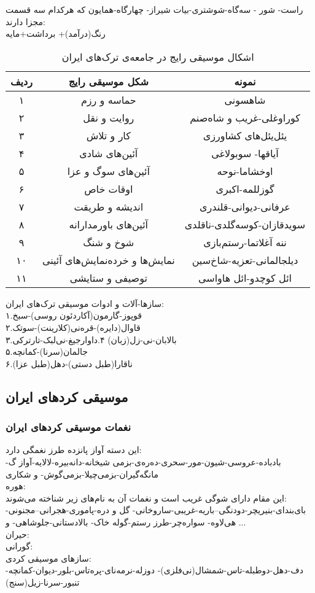        راست- شور - سه‌گاه-شوشتری-بیات شیراز- چهارگاه-همایون
        که هرکدام سه قسمت مجزا دارند:\\
        
        رنگ(درآمد)+ برداشت+مایه
        
        \begin{table}[!h]
\centering
\begin{tabular}{|c|c|c|}
	\hline
    ردیف &  شکل موسیقی رایج &  نمونه\\
	\hline\hline
    ۱ & حماسه و رزم & شاهسونی \\
	\hline
    ۲ & روایت و نقل& کوراوغلی-غریب و شاه‌صنم \\
	\hline
	۳ & کار و تلاش & یئل‌یئل‌های کشاورزی
\\	\hline
	۴ &آئین‌های شادی  & آیاقها- سوبولاغی \\
	\hline
	۵ & آئین‌های سوگ و عزا & اوخشاما-نوحه \\
	\hline
	۶ & اوقات خاص & گوزللمه-اکبری \\
	\hline
	۷ & اندیشه و طریقت & عرفانی-دیوانی-قلندری  \\
	\hline
	۸ & آئین‌های باورمدارانه & سویدقازان-کوسه‌گلدی-ناقلدی\\
	\hline
	۹ &  شوخ و شنگ & ننه آغلاتما-رستم‌بازی\\
	\hline
	۱۰ & نمایش‌ها و خرده‌نمایش‌های آئینی & دیلجالمانی-تعزیه-شاخ‌سین  \\
	\hline
	۱۱ & توصیفی و ستایشی  & ائل کوچدو-ائل هاواسی  \\
	\hline
\end{tabular}
\caption{اشکال موسیقی رایج در جامعه‌ی ترک‌های ایران}
\label{t1}
\end{table}
سازها-آلات و ادوات موسیقی ترک‌های ایران:\\
۱.قوپوز-گارمون(آکاردئون روسی)-سبخ\\
۲.قاوال(دایره)-قره‌نی(کلارینت)-سوتک\\
۳.بالابان-نی-زل(زبان)
۴.داوارجیغ-نی‌لبک-تارترکی\\
۵.جالمان(سرنا)-کمانچه\\
۶.ناقارا(طبل دستی)-دهل(طبل عزا)
\subsection{موسیقی کردهای ایران}
\subsubsection{نغمات موسیقی کردهای ایران}
این دسته آواز پانزده طرز نغمگی دارد:\\
بادباده-عروسی-شیون-مور-سحری-ده‌ره‌ی-بزمی شیخانه-دانه‌بیره-لالایه-آواز گ-مانگه‌گیران-بزمی‌چیلا-بزمی‌گوش- و شکاری
\\هوره:\\
این مقام دارای شوگی غریب است و نغمات آن به نام‌های زیر شناخته می‌شوند:\\
بای‌بندای-بنیریچر-دودنگی--باریه-غریبی-ساروخانی- گل و دره-پاموری-هجرانی--مجنونی-هی‌لاوه- سواره‌چر-طرز رستم-گوله خاک- بالادستانی-جلوشاهی- و ...\\
حیران:\\
گورانی:\\
سازهای موسیقی کردی:\\
دف-دهل-دوطبله-تاس-شمشال(نی‌فلزی)- دوزله-نرمه‌نای-پره‌تاس-بلور-دیوان-کمانچه-تنبور-سرنا-زیل(سنج)
